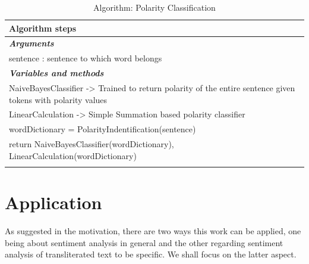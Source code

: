 \documentclass[12pt]{book}
\begin{document}
\begin{longtable}[c]{ |p{16cm}|  }
  \hline
  \textbf{Algorithm steps} \\
  \hline
  \endhead
  \textbf{\textit{Arguments}} \\
  \hline
  sentence : sentence to which word belongs\\
  \hline
  \textbf{\textit{Variables and methods}} \\
  \hline
  NaiveBayesClassifier -> Trained to return polarity of the entire sentence given tokens with polarity values\\
  LinearCalculation -> Simple Summation based polarity classifier\\
  \hline

  wordDictionary = PolarityIndentification(sentence)\\
  return NaiveBayesClassifier(wordDictionary), LinearCalculation(wordDictionary)\\
  \hline

  \caption{ Algorithm: Polarity Classification}\label{tab:tab_polarity_classifer}\\
\end{longtable}



\chapter{Application}

As suggested in the motivation, there are two ways this work can be applied,
one being about sentiment analysis in general and the other regarding sentiment
analysis of transliterated text to be specific. We shall focus on the latter
aspect. 
\end{document}
